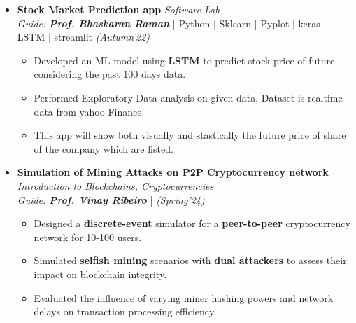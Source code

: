 \documentclass[a4paper,10.5pt]{article}
\begin{document}
\begin{itemize}[noitemsep,nolistsep]
\item \textbf{Stock Market Prediction app} \hfill {\emph{Software Lab}}\\
\emph{Guide: \textbf{Prof. Bhaskaran Raman}} | Python | Sklearn
 | Pyplot | keras | LSTM | streamlit \hfill
\emph{(Autumn'22)}
\begin{itemize}[noitemsep,nolistsep]
\vspace{0.1cm}
    \item Developed an ML model using \textbf{LSTM} to predict stock price of future considering the past 100 days data.
    \vspace{0.07cm}
    
    \item Performed Exploratory Data analysis on given data, Dataset is realtime data from yahoo Finance.

    \vspace{0.07cm}
    \item This app will show both visually and stastically the future price of share of the company which are listed.  
\end{itemize}
\vspace{0.15cm}

\item \textbf{Simulation of Mining Attacks on P2P Cryptocurrency network}  \hfill {\emph{Introduction to Blockchains, Cryptocurrencies}}\\
\emph{Guide: \textbf{Prof. Vinay Ribeiro}} |  \hfill
\emph{(Spring'24)}
\vspace{0.1cm}
\begin{itemize}[noitemsep,nolistsep]
    \item Designed a \textbf{discrete-event} simulator for a \textbf{peer-to-peer} cryptocurrency network for 10-100 users.
    \vspace{0.07cm}
    \item Simulated \textbf{selfish mining} scenarios with \textbf{dual attackers} to assess their impact on blockchain integrity.
    \vspace{0.07cm}
    \item Evaluated the influence of varying miner hashing powers and network delays on transaction processing efficiency.
\end{itemize}
\vspace{0.15cm}


\end{itemize}
\end{document}
